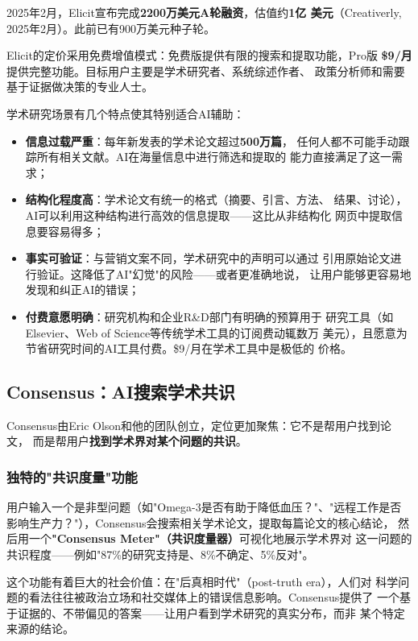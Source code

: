 2025年2月，Elicit宣布完成\textbf{2200万美元A轮融资}，估值约\textbf{1亿
美元}（Creativerly, 2025年2月）。此前已有900万美元种子轮。

Elicit的定价采用免费增值模式：免费版提供有限的搜索和提取功能，Pro版
\textbf{\$9/月}提供完整功能。目标用户主要是学术研究者、系统综述作者、
政策分析师和需要基于证据做决策的专业人士。

\begin{whybox}[为什么学术研究是AI工具的理想场景？]
学术研究场景有几个特点使其特别适合AI辅助：
\begin{itemize}
  \item \textbf{信息过载严重}：每年新发表的学术论文超过\textbf{500万篇}，
    任何人都不可能手动跟踪所有相关文献。AI在海量信息中进行筛选和提取的
    能力直接满足了这一需求；
  \item \textbf{结构化程度高}：学术论文有统一的格式（摘要、引言、方法、
    结果、讨论），AI可以利用这种结构进行高效的信息提取——这比从非结构化
    网页中提取信息要容易得多；
  \item \textbf{事实可验证}：与营销文案不同，学术研究中的声明可以通过
    引用原始论文进行验证。这降低了AI"幻觉"的风险——或者更准确地说，
    让用户能够更容易地发现和纠正AI的错误；
  \item \textbf{付费意愿明确}：研究机构和企业R\&D部门有明确的预算用于
    研究工具（如Elsevier、Web of Science等传统学术工具的订阅费动辄数万
    美元），且愿意为节省研究时间的AI工具付费。\$9/月在学术工具中是极低的
    价格。
\end{itemize}
\end{whybox}

\subsection{Consensus：AI搜索学术共识}
\label{subsec:ch06-consensus}

Consensus由Eric Olson和他的团队创立，定位更加聚焦：它不是帮用户找到论文，
而是帮用户\textbf{找到学术界对某个问题的共识}。

\subsubsection{独特的"共识度量"功能}
用户输入一个是非型问题（如"Omega-3是否有助于降低血压？"、"远程工作是否
影响生产力？"），Consensus会搜索相关学术论文，提取每篇论文的核心结论，
然后用一个\textbf{"Consensus Meter"（共识度量器）}可视化地展示学术界对
这一问题的共识程度——例如"87\%的研究支持是、8\%不确定、5\%反对"。

这个功能有着巨大的社会价值：在"后真相时代"（post-truth era），人们对
科学问题的看法往往被政治立场和社交媒体上的错误信息影响。Consensus提供了
一个基于证据的、不带偏见的答案——让用户看到学术研究的真实分布，而非
某个特定来源的结论。

